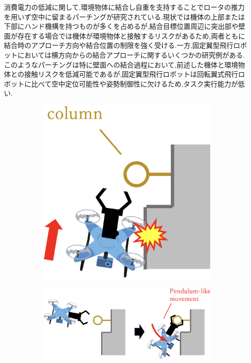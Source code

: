 \documentclass{jarticle}
\begin{document}
消費電力の低減に関して,環境物体に結合し自重を支持することでロータの推力を用いず空中に留まるパーチングが研究されている.現状では機体の上部または下部にハンド機構を持つものが多くを占める\cite{overheadperching}\cite{underhandperching}が,結合目標位置周辺に突出部や壁面が存在する場合では機体が環境物体と接触するリスクがあるため,両者ともに結合時のアプローチ方向や結合位置の制限を強く受ける.一方,固定翼型飛行ロボットにおいては横方向からの結合アプローチに関するいくつかの研究例がある\cite{horizon}\cite{horizon2}.このようなパーチングは特に壁面への結合過程において,前述した機体と環境物体との接触リスクを低減可能であるが,固定翼型飛行ロボットは回転翼式飛行ロボットに比べて空中定位可能性や姿勢制御性に欠けるため,タスク実行能力が低い.
\begin{figure}[tb]
  \centering
  \begin{subfigure}{0.25\columnwidth}
    \includegraphics[width=\textwidth]{figs/collision.eps}
    \vspace{-6mm}
    \caption{}
    \label{fig:collisionimage}
  \end{subfigure}
  \begin{subfigure}{0.68\columnwidth}
    \includegraphics[width=\textwidth]{figs/perching_grasping.eps}

\end{subfigure}
\end{figure}
\end{document}
